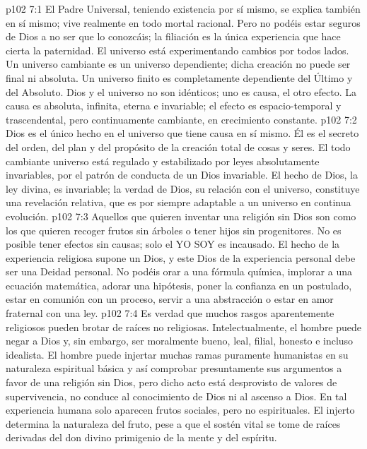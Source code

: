 \vs p102 7:1 El Padre Universal, teniendo existencia por sí mismo, se explica también en sí mismo; vive realmente en todo mortal racional. Pero no podéis estar seguros de Dios a no ser que lo conozcáis; la filiación es la única experiencia que hace cierta la paternidad. El universo está experimentando cambios por todos lados. Un universo cambiante es un universo dependiente; dicha creación no puede ser final ni absoluta. Un universo finito es completamente dependiente del Último y del Absoluto. Dios y el universo no son idénticos; uno es causa, el otro efecto. La causa es absoluta, infinita, eterna e invariable; el efecto es espacio\hyp{}temporal y trascendental, pero continuamente cambiante, en crecimiento constante.
\vs p102 7:2 Dios es el único hecho en el universo que tiene causa en sí mismo. Él es el secreto del orden, del plan y del propósito de la creación total de cosas y seres. El todo cambiante universo está regulado y estabilizado por leyes absolutamente invariables, por el patrón de conducta de un Dios invariable. El hecho de Dios, la ley divina, es invariable; la verdad de Dios, su relación con el universo, constituye una revelación relativa, que es por siempre adaptable a un universo en continua evolución.
\vs p102 7:3 \pc Aquellos que quieren inventar una religión sin Dios son como los que quieren recoger frutos sin árboles o tener hijos sin progenitores. No es posible tener efectos sin causas; solo el YO SOY es incausado. El hecho de la experiencia religiosa supone un Dios, y este Dios de la experiencia personal debe ser una Deidad personal. No podéis orar a una fórmula química, implorar a una ecuación matemática, adorar una hipótesis, poner la confianza en un postulado, estar en comunión con un proceso, servir a una abstracción o estar en amor fraternal con una ley.
\vs p102 7:4 Es verdad que muchos rasgos aparentemente religiosos pueden brotar de raíces no religiosas. Intelectualmente, el hombre puede negar a Dios y, sin embargo, ser moralmente bueno, leal, filial, honesto e incluso idealista. El hombre puede injertar muchas ramas puramente humanistas en su naturaleza espiritual básica y así comprobar presuntamente sus argumentos a favor de una religión sin Dios, pero dicho acto está desprovisto de valores de supervivencia, no conduce al conocimiento de Dios ni al ascenso a Dios. En tal experiencia humana solo aparecen frutos sociales, pero no espirituales. El injerto determina la naturaleza del fruto, pese a que el sostén vital se tome de raíces derivadas del don divino primigenio de la mente y del espíritu.
